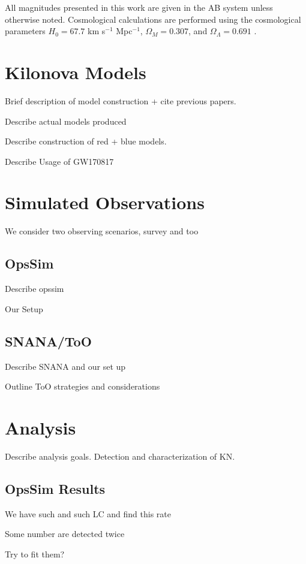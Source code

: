 All magnitudes presented in this work are given in the AB system unless otherwise noted. Cosmological calculations are performed using the cosmological parameters $H_0 = 67.7$ km s$^{-1}$ Mpc$^{-1}$, $\Omega_M = 0.307$, and $\Omega_{\Lambda} = 0.691$ \citep{Planck2016}.

\section{Kilonova Models}
\label{sec:ch6_models}
Brief description of model construction + cite previous papers.

Describe actual models produced

Describe construction of red + blue models.

Describe Usage of GW170817

\section{Simulated Observations}
\label{sec:ch6_obs}

We consider two observing scenarios, survey and too

\subsection{OpsSim}
\label{sec:ch6_opssim}
Describe opssim

Our Setup

\subsection{SNANA/ToO}
\label{sec:ch6_snana}
Describe SNANA and our set up

Outline ToO strategies and considerations

\section{Analysis}
\label{sec:ch6_analysis}
Describe analysis goals. Detection and characterization of KN. 

\subsection{OpsSim Results}
\label{sec:ch6_opssim_results}
We have such and such LC and find this rate

Some number are detected twice

Try to fit them?

